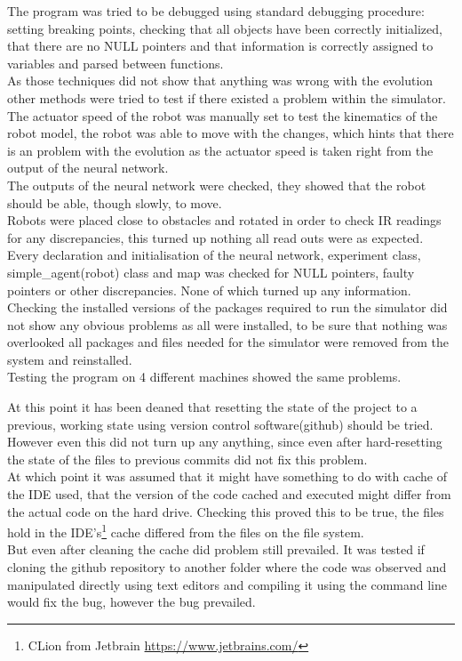 The program was tried to be debugged using standard debugging procedure: setting breaking points, checking that all objects have been correctly initialized, that there are no NULL pointers and that information is correctly assigned to variables and parsed between functions.\\
As those techniques did not show that anything was wrong with the evolution other methods were tried to test if there existed a problem within the simulator.\\
The actuator speed of the robot was manually set to test the kinematics of the robot model, the robot was able to move with the changes, which hints that there is an problem with the evolution as the actuator speed is taken right from the output of the neural network.\\
The outputs of the neural network were checked, they showed that the robot should be able, though slowly, to move. \\
Robots were placed close to obstacles and rotated in order to check IR readings for any discrepancies, this turned up nothing all read outs were as expected.\\
Every declaration and initialisation of the neural network, experiment class, simple\_agent(robot) class and map was checked for NULL pointers, faulty pointers or other discrepancies. None of which turned up any information.\\
Checking the installed versions of the packages required to run the simulator did not show any obvious problems as all were installed, to be sure that nothing was overlooked all packages and files needed for the simulator were removed from the system and reinstalled.\\
Testing the program on 4 different machines showed the same problems. 

At this point it has been deaned that resetting the state of the project to a previous, working state using version control software(github) should be tried.\\
However even this did not turn up any anything, since even after hard-resetting the state of the files to previous commits did not fix this problem.\\
At which point it was assumed that it might have something to do with cache of the IDE used, that the version of the code cached and executed might differ from the actual code on the hard drive. 
Checking this proved this to be true, the files hold in the  IDE's\footnote{CLion from Jetbrain \url{https://www.jetbrains.com/}}  cache differed from the files on the file system.\\
But even after cleaning the cache did problem still prevailed. It was tested if cloning the github repository to another folder where the code was observed and manipulated directly using text editors and compiling it using the command line would fix the bug, however the bug prevailed. \\

